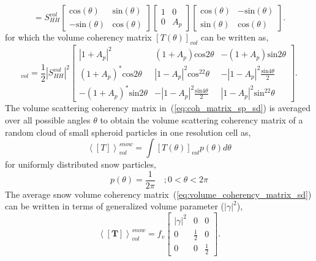 \begin{equation}
	[S_{vol}]=S_{HH}^{vol}\left[\begin{array}{cc}
		\mbox{cos}(\theta) & \mbox{sin}(\theta) \\
		-\mbox{sin}(\theta) & \mbox{cos}(\theta)
	\end{array}\right]\left[\begin{array}{cc}
	1 & 0 \\
	0 & A_{p}
\end{array}\right]\left[\begin{array}{cc}
\mbox{cos}(\theta) & -\mbox{sin}(\theta) \\
\mbox{sin}(\theta) & \mbox{cos}(\theta)
\end{array}\right].
\label{eq:rotated_volume_scattering_matrix_sd}
\end{equation}
for which the volume coherency matrix $[T(\theta)]_{vol}$ can be written as,
\begin{equation}
	[T(\theta)]_{vol}=\frac{1}{2}\left|S_{HH}^{vol}\right|^2\left[\begin{array}{ccc}
		|1+A_{p}|^2 & (1 + A_{p})\mbox{cos}2\theta & -(1 + A_{p})\mbox{sin}2\theta    \\
		(1 + A_{p})^*\mbox{cos}2\theta & |1-A_{p}|^2\mbox{cos}^22\theta  & -|1-A_{p}|^2\frac{\mbox{sin}4\theta}{2}   \\ 
		-(1 + A_{p})^*\mbox{sin}2\theta & -|1-A_{p}|^2\frac{\mbox{sin}4\theta}{2} & |1-A_{p}|^2\mbox{sin}^22\theta
	\end{array}\right].
	\label{eq:coh_matrix_sp_sd}
\end{equation}
The volume scattering coherency matrix in~(\ref{eq:coh_matrix_sp_sd}) is averaged over all possible angles $\theta$ to obtain the volume scattering coherency matrix of a random cloud of small spheroid particles in one resolution cell as,
\begin{equation}
	\left\langle[T]\right\rangle_{vol}^{snow}=\int[T(\theta)]_{vol}p(\theta)d\theta
	\label{eq:average_coherency_matrix_sd}
\end{equation}
for uniformly distributed snow particles, 
\begin{equation}
	p(\theta)=\frac{1}{2\pi} \quad; 0<\theta<2\pi
	\label{eq:uniform_distrbn_sd}
\end{equation}
The average snow volume coherency matrix~(\ref{eq:volume_coherency_matrix_sd}) can be written in terms of generalized volume parameter ($|\gamma|^2$), 
\begin{equation}
	\left\langle\mathbf{[T]}\right\rangle_{vol}^{snow} = f_{v}\left[ \begin{array}{ccc}
		|\gamma|^{2} & 0 & 0 \\
		0 & \frac{1}{2} & 0 \\
		0 & 0 & \frac{1}{2}
	\end{array}\right].
	\label{eq:volume_coherency_matrix_sd}
\end{equation}
